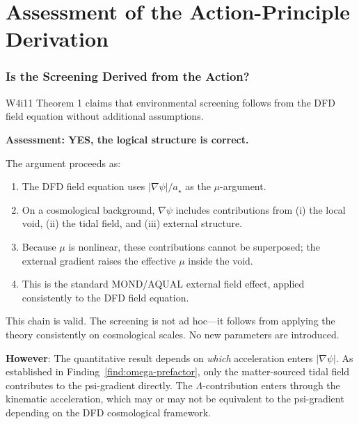 \documentclass[11pt,a4paper]{article}
\newcommand{\astar}{a_\star}
\newcommand{\mufd}{\mu}
\begin{document}
\part{Assessment of the Action-Principle Derivation}
\label{part:action}


\section{Is the Screening Derived from the Action?}
\label{sec:action-assessment}

W4i11 Theorem 1 claims that environmental screening follows from
the DFD field equation without additional assumptions.

\textbf{Assessment: YES, the logical structure is correct.}

The argument proceeds as:
\begin{enumerate}
\item The DFD field equation uses $|\nabla\psi|/\astar$ as the
  $\mufd$-argument.
\item On a cosmological background, $\nabla\psi$ includes
  contributions from (i) the local void, (ii) the tidal field,
  and (iii) external structure.
\item Because $\mufd$ is nonlinear, these contributions cannot
  be superposed; the external gradient raises the effective
  $\mufd$ inside the void.
\item This is the standard MOND/AQUAL external field effect,
  applied consistently to the DFD field equation.
\end{enumerate}

This chain is valid. The screening is not ad hoc---it follows
from applying the theory consistently on cosmological scales.
No new parameters are introduced.

\textbf{However}: The quantitative result depends on \emph{which}
acceleration enters $|\nabla\psi|$. As established in
Finding~\ref{find:omega-prefactor}, only the matter-sourced
tidal field contributes to the psi-gradient directly. The
$\Lambda$-contribution enters through the kinematic acceleration,
which may or may not be equivalent to the psi-gradient depending
on the DFD cosmological framework.
\end{document}
